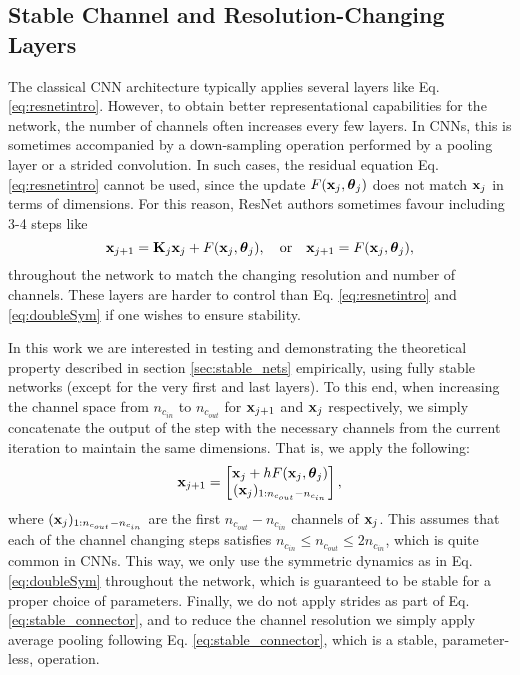 \documentclass[reqno]{amsart}
\newcommand{\bfx}{ {\bf x}}
\newcommand{\bfK}{{\bf K}}
\newcommand{\bftheta}{{\boldsymbol{\theta}}}
\begin{document}
\subsection{\textbf{Stable Channel and Resolution-Changing Layers}}
\label{sub:stable_connector}
The classical CNN architecture typically applies several layers like Eq. \eqref{eq:resnetintro}. However, to obtain better representational capabilities for the network, the number of channels often increases every few layers. In CNNs, this is sometimes accompanied by a down-sampling operation performed by a pooling layer or a strided convolution. In such cases, the residual equation Eq. \eqref{eq:resnetintro} cannot be used, since the update $F(\bfx_j,\bftheta_j)$ does not match $\bfx_j$ in terms of dimensions. For this reason, ResNet authors sometimes favour including 3-4 steps like
\begin{equation}
    \bfx_{j+1} = \bfK_j\bfx_j + F(\bfx_j,\bftheta_j),\quad \mbox{or}\quad    \bfx_{j+1} = F(\bfx_j,\bftheta_j), 
\end{equation}
throughout the network to match the changing resolution and number of channels. These layers are harder to control than Eq. \eqref{eq:resnetintro} and \eqref{eq:doubleSym} if one wishes to ensure stability.   

In this work we are interested in testing and demonstrating the theoretical property described in section \ref{sec:stable_nets} empirically, using fully stable networks (except for the very first and last layers). To this end, when increasing the channel space from $n_{c_{in}}$ to $n_{c_{out}}$ for $\bfx_{j+1}$ and $\bfx_j$ respectively, we simply concatenate the output of the step with the necessary channels from the current iteration to maintain the same dimensions. That is, we apply the following:
\begin{equation}
\label{eq:stable_connector}
    \bfx_{j+1} = \begin{bmatrix}
    \bfx_j + h F(\bfx_j, \bftheta_{j})\\
    (\bfx_j)_{1:n_{c_{out}} - n_{c_{in}}}
    \end{bmatrix},
\end{equation}
where $(\bfx_j)_{1:n_{c_{out}} - n_{c_{in}}}$ are the first $n_{c_{out}} - n_{c_{in}}$ channels of $\bfx_j$. This assumes that each of the channel changing steps satisfies $n_{c_{in}} \leq n_{c_{out}} \leq 2n_{c_{in}}$, which is quite common in CNNs. This way, we only use the symmetric dynamics as in Eq. \eqref{eq:doubleSym} throughout the network, which is guaranteed to be stable for a proper choice of parameters. Finally, we do not apply strides as part of Eq. \eqref{eq:stable_connector}, and to reduce the channel resolution we simply apply average pooling following Eq. \eqref{eq:stable_connector}, which is a stable, parameter-less, operation. 
\end{document}
